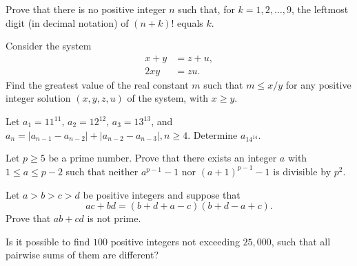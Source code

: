 \item[\textbf{N1.}]Prove that there is no positive integer $n$ such that, for $k = 1,2,\ldots,9$,  the leftmost digit (in decimal notation) of $(n+k)!$ equals $k$.

\item[\textbf{N2.}]Consider the system \begin{align*}x + y  &= z + u,\\2xy & = zu.\end{align*}Find the greatest value of the real constant $m$ such that $m \leq x/y$ for any positive integer solution $(x,y,z,u)$ of the system, with $x \geq y$.

\item[\textbf{N3.}]Let $ a_1 = 11^{11}, \, a_2 = 12^{12}, \, a_3 = 13^{13}$,  and $ a_n = |a_{n - 1} - a_{n - 2}| + |a_{n - 2} - a_{n - 3}|, n \geq 4.$ Determine $ a_{14^{14}}$.

\item[\textbf{N4.}]Let $p \geq 5$ be a prime number. Prove that there exists an integer $a$ with $1 \leq a \leq p-2$ such that neither $a^{p-1}-1$ nor $(a+1)^{p-1}-1$ is divisible by $p^2$.

\item[\textbf{N5.}]Let $a > b > c > d$ be positive integers and suppose that \[ ac + bd = (b+d+a-c)(b+d-a+c).  \] Prove that $ab + cd$ is not prime.

\item[\textbf{N6.}]Is it possible to find  $100$ positive integers not exceeding $25,000$,  such that all pairwise sums of them are different?

